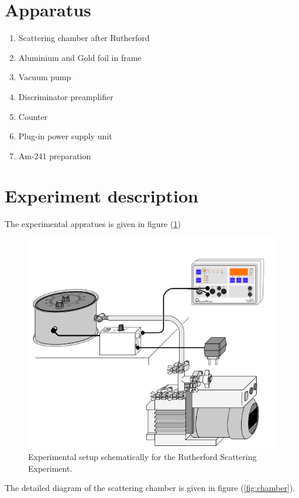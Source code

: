 \documentclass[%
 reprint,
nofootinbib,
 amsmath,amssymb,
 aps,
floatfix,
]{revtex4-2}
\begin{document}
\section{Apparatus}
\begin{enumerate}
    \item Scattering chamber after Rutherford
    \item Aluminium and Gold foil in frame
    \item Vacuum pump
    \item Discriminator preamplifier
    \item Counter
    \item Plug-in power supply unit
    \item Am-241 preparation
\end{enumerate}

\section{Experiment description}
    The experimental appratues is given in figure (\ref{fig:setup})
    \begin{figure}
        \centering
        \includegraphics[scale = 0.5]{Figures/setup.png}
        \caption{Experimental setup schematically for the Rutherford Scattering Experiment.}
        \label{fig:setup}
    \end{figure}
    The detailed diagram of the scattering chamber is given in figure (\ref{fig:chamber}).
\end{document}
